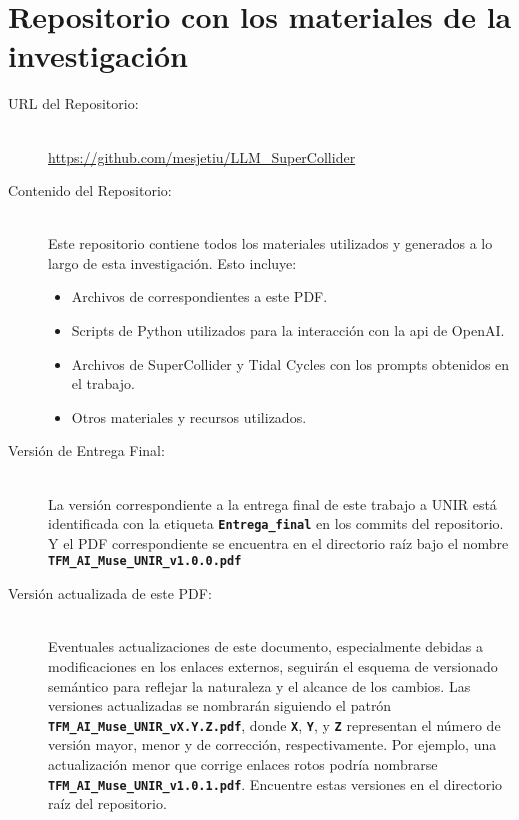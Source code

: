 \chapter{Repositorio con los materiales de la investigación}
\label{anexo:repositorio}



\begin{center}
\end{center}

\begin{description}
    \item[URL del Repositorio:] \hfill \\
    \url{https://github.com/mesjetiu/LLM_SuperCollider}
    
    \item[Contenido del Repositorio:] \hfill \\
    Este repositorio contiene todos los materiales utilizados y generados a lo largo de esta investigación. Esto incluye:
    \begin{itemize}
        \item Archivos de  correspondientes a este PDF.
        \item Scripts de Python utilizados para la interacción con la \gls{api} de OpenAI.
        \item Archivos de SuperCollider y Tidal Cycles con los {prompts} obtenidos en el trabajo.
        \item Otros materiales y recursos utilizados.
    \end{itemize}
    
    \item[Versión de Entrega Final:] \hfill \\
    La versión correspondiente a la entrega final de este trabajo a UNIR está identificada con la etiqueta \textbf{\texttt{Entrega\_final}} en los commits del repositorio. Y el PDF correspondiente se encuentra en el directorio raíz bajo el nombre \textbf{\texttt{TFM\_AI\_Muse\_UNIR\_v1.0.0.pdf}}

	\item[Versión actualizada de este PDF:] \hfill \\
    Eventuales actualizaciones de este documento, especialmente debidas a modificaciones en los enlaces externos, seguirán el esquema de versionado semántico para reflejar la naturaleza y el alcance de los cambios. Las versiones actualizadas se nombrarán siguiendo el patrón \textbf{\texttt{TFM\_AI\_Muse\_UNIR\_vX.Y.Z.pdf}}, donde \textbf{\texttt{X}}, \textbf{\texttt{Y}}, y \textbf{\texttt{Z}} representan el número de versión mayor, menor y de corrección, respectivamente. Por ejemplo, una actualización menor que corrige enlaces rotos podría nombrarse \textbf{\texttt{TFM\_AI\_Muse\_UNIR\_v1.0.1.pdf}}. Encuentre estas versiones en el directorio raíz del repositorio.


\end{description}



